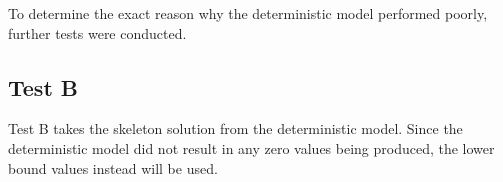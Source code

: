 \documentclass[../thesis.tex]{subfiles}
\begin{document}
\begin{table}[h!]
    \centering{}
    \caption{Test A results for the worked example using average daily bed demand values, with results recorded in the form [(beds), (staff)].}
    \label{tab:WENorDemandTestA}
\end{table}
\begin{table}[h!]
    \centering{}
    \caption{Test A results for the worked example using high daily bed demand values, with results recorded in the form [(beds), (staff)].}
    \label{tab:WEHighDemandTestA}
\end{table}

To determine the exact reason why the deterministic model performed poorly, further tests were conducted.

\subsection{Test B}
Test B takes the skeleton solution from the deterministic model. Since the deterministic model did not result in any zero values being produced, the lower bound values instead will be used. 
\end{document}
